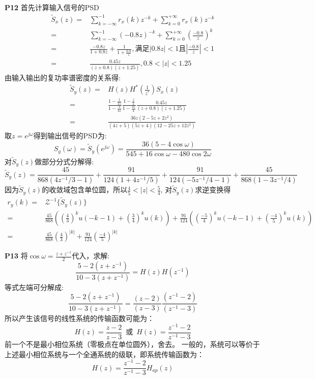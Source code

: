 \documentclass{article}
\begin{document}
\textbf{P12}
首先计算输入信号的PSD
\begin{align}
\tilde{S}_x(z)=&\sum_{k=-\infty}^{-1} r_x(k)z^{-k}+\sum_{k=0}^{+\infty} r_x(k)z^{-k}\\
=&\sum_{k=-\infty}^{-1} (-0.8z)^{-k}+\sum_{k=0}^{+\infty} (\frac{-0.8}{z})^{k}\\
=&\frac{-0.8z}{1+0.8z}+\frac{1}{1+\frac{0.8}{z}},\text{满足}|0.8z|<1 \text{且} |\frac{-0.8}{z}|<1\\
=&\frac{0.45z}{(z+0.8)(z+1.25)},0.8<|z|<1.25
\end{align}
由输入输出的复功率谱密度的关系得:
\begin{align}
\tilde{S}_y(z)=&H(z)H^*(\frac{1}{z^*})S_x(z)\\
=&\frac{1-\frac{1}{2z}}{1-\frac{3}{4z}}\frac{1-\frac{z}{2}}{1-\frac{3z}{4}}\frac{0.45z}{(z+0.8)(z+1.25)}\\
=&\frac{36z(2-5z+2z^2)}{(4z+5)(5z+4)(12-25z+12z^2)}
\end{align}
取$z=e^{j\omega}$得到输出信号的PSD为:
\begin{equation}
S_y(\omega)=\tilde{S}_y(e^{j\omega})=\frac{36(5-4\cos\omega)}{545+16\cos\omega-480\cos2\omega}
\end{equation}
对$\tilde{S}_y(z)$做部分分式分解得:
\begin{equation}
\tilde{S}_y(z)=\frac{45}{868 (4z^{-1}/3-1)}+\frac{91}{124 (1+4z^{-1}/5)}+\frac{91}{124 (-5 z^{-1}/4-1)}+\frac{45}{868 (1-3 z^{-1}/4)}
\end{equation}
因为$\tilde{S}_y(z)$的收敛域包含单位圆，所以$\frac{4}{5}<|z|<\frac{5}{4}$,
对$\tilde{S}_y(z)$求逆变换得
\begin{align}
r_y(k)=&\mathcal{Z}^{-1}\{\tilde{S}_y(z)\}\\
=&\frac{45}{868}((\frac{4}{3})^ku(-k-1)+(\frac{3}{4})^ku(k))+\frac{91}{124}((\frac{-5}{4})^ku(-k-1)+(\frac{-4}{5})^ku(k))\\
=&\frac{45}{868}(\frac{4}{3})^{|k|}+\frac{91}{124}(\frac{-4}{5})^{|k|}
\end{align}

\textbf{P13}
将$\cos\omega=\frac{z+z^{-1}}{2}$代入，求解:
\begin{equation}
\frac{5-2(z+z^{-1})}{10-3(z+z^{-1})}=H(z)H(z^{-1})
\end{equation}
等式左端可分解成:
\begin{equation}
\frac{5-2(z+z^{-1})}{10-3(z+z^{-1})}=\frac{(z-2)}{(z-3)}\frac{(z^{-1}-2)}{(z^{-1}-3)}
\end{equation}
所以产生该信号的线性系统的传输函数可能为：
\begin{equation}
H(z)=\frac{z-2}{z-3}\, \text{ 或 } \,H(z)=\frac{z^{-1}-2}{z^{-1}-3}
\end{equation}
前一个不是最小相位系统（零极点在单位圆外），舍去。
一般的，系统可以等价于上述最小相位系统与一个全通系统的级联，即系统传输函数为：
\begin{equation}
H(z)=\frac{z^{-1}-2}{z^{-1}-3}H_{ap}(z)
\end{equation}
\end{document}
